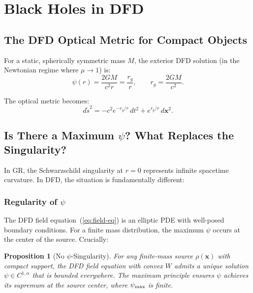 \documentclass[aps,prd,twocolumn,superscriptaddress,nofootinbib]{revtex4-2}
\newtheorem{proposition}{Proposition}
\begin{document}
\section{Black Holes in DFD}\label{sec:black-holes}

\subsection{The DFD Optical Metric for Compact Objects}

For a static, spherically symmetric mass $M$, the exterior
DFD solution (in the Newtonian regime where $\mu \to 1$) is:
\begin{equation}
\psi(r) = \frac{2GM}{c^2 r} = \frac{r_g}{r},
\qquad r_g = \frac{2GM}{c^2}.
\end{equation}

The optical metric becomes:
\begin{equation}\label{eq:dfd-schwarzschild}
d\tilde{s}^2 = -c^2 e^{-r_g/r}\,dt^2 + e^{r_g/r}\,d\mathbf{x}^2.
\end{equation}

\subsection{Is There a Maximum $\psi$? What Replaces the Singularity?}

In GR, the Schwarzschild singularity at $r = 0$ represents
infinite spacetime curvature. In DFD, the situation is
fundamentally different:

\subsubsection{Regularity of $\psi$}

The DFD field equation~(\ref{eq:field-eq}) is an elliptic PDE
with well-posed boundary conditions. For a finite mass distribution,
the maximum $\psi$ occurs at the center of the source. Crucially:

\begin{proposition}[No $\psi$-Singularity]
For any finite-mass source $\rho(\mathbf{x})$ with compact
support, the DFD field equation with convex $W$ admits a unique
solution $\psi \in C^{1,\alpha}$ that is bounded everywhere.
The maximum principle ensures $\psi$ achieves its supremum at
the source center, where $\psi_{\rm max}$ is finite.
\end{proposition}
\end{document}

